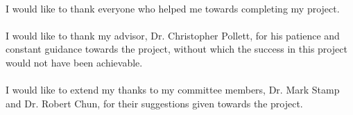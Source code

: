\paragraph{}
I would like to thank everyone who helped me towards completing my project.

\paragraph{}
I would like to thank my advisor, Dr. Christopher Pollett, for his patience and constant guidance towards the project, without which the success in this project would not have been achievable.

\paragraph{}
I would like to extend my thanks to my committee members, Dr. Mark Stamp and Dr. Robert Chun, for their suggestions given towards the project.


